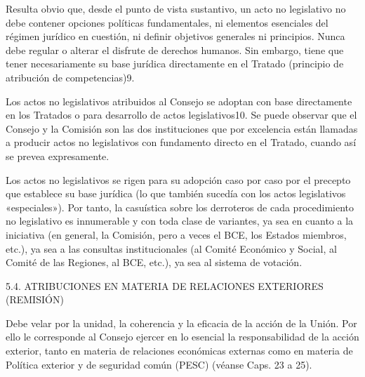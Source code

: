 \documentclass[10pt,a4paper]{article}
\begin{document}
Resulta obvio que, desde el punto de vista sustantivo, un acto no legislativo no debe contener opciones políticas fundamentales, ni elementos esenciales del régimen jurídico en cuestión, ni definir objetivos generales ni principios. Nunca debe regular o alterar el disfrute de derechos humanos. Sin embargo, tiene que tener necesariamente su base jurídica directamente en el Tratado (principio de atribución de competencias)9.

Los actos no legislativos atribuidos al Consejo se adoptan con base directamente en los Tratados o para desarrollo de actos legislativos10. Se puede observar que el Consejo y la Comisión son las dos instituciones que por excelencia están llamadas a producir actos no legislativos con fundamento directo en el Tratado, cuando así se prevea expresamente.

Los actos no legislativos se rigen para su adopción caso por caso por el precepto que establece su base jurídica (lo que también sucedía con los actos legislativos «especiales»). Por tanto, la casuística sobre los derroteros de cada procedimiento no legislativo es innumerable y con toda clase de variantes, ya sea en cuanto a la iniciativa (en general, la Comisión, pero a veces el BCE, los Estados miembros, etc.), ya sea a las consultas institucionales (al Comité Económico y Social, al Comité de las Regiones, al BCE, etc.), ya sea al sistema de votación.

5.4. ATRIBUCIONES EN MATERIA DE RELACIONES EXTERIORES
(REMISIÓN)

Debe velar por la unidad, la coherencia y la eficacia de la acción de la Unión. Por ello le corresponde al Consejo ejercer en lo esencial la responsabilidad de la acción exterior, tanto en materia de relaciones económicas externas como en materia de Política exterior y de seguridad común (PESC) (véanse Caps. 23 a 25).
\end{document}

